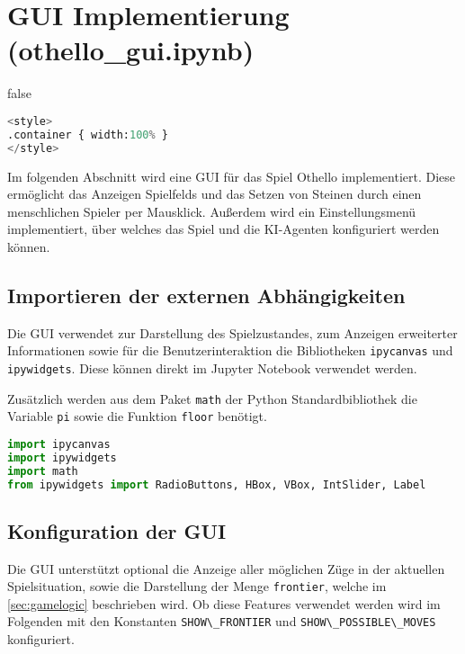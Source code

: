 \hypertarget{gui-implementierung-othello_gui.ipynb}{%
\section{GUI Implementierung
(othello\_gui.ipynb)}\label{gui-implementierung-othello_gui.ipynb}}

\label{sec:gui} \ifx false

\begin{lstlisting}[language=Python]
%%HTML
<style>
.container { width:100% }
</style>
\end{lstlisting}

\fi Im folgenden Abschnitt wird eine \ac{GUI} für das Spiel Othello
implementiert. Diese ermöglicht das Anzeigen Spielfelds und das Setzen
von Steinen durch einen menschlichen Spieler per Mausklick. Außerdem
wird ein Einstellungsmenü implementiert, über welches das Spiel und die
\ac{KI}-Agenten konfiguriert werden können.

\hypertarget{importieren-der-externen-abhuxe4ngigkeiten}{%
\subsection{Importieren der externen
Abhängigkeiten}\label{importieren-der-externen-abhuxe4ngigkeiten}}

Die \ac{GUI} verwendet zur Darstellung des Spielzustandes, zum Anzeigen
erweiterter Informationen sowie für die Benutzerinteraktion die
Bibliotheken \passthrough{\lstinline!ipycanvas!} und
\passthrough{\lstinline!ipywidgets!}. Diese können direkt im Jupyter
Notebook verwendet werden.

Zusätzlich werden aus dem Paket \passthrough{\lstinline!math!} der
Python Standardbibliothek die Variable \passthrough{\lstinline!pi!}
sowie die Funktion \passthrough{\lstinline!floor!} benötigt.

\begin{lstlisting}[language=Python]
import ipycanvas
import ipywidgets
import math
from ipywidgets import RadioButtons, HBox, VBox, IntSlider, Label
\end{lstlisting}

\hypertarget{konfiguration-der-gui}{%
\subsection{Konfiguration der GUI}\label{konfiguration-der-gui}}

Die \ac{GUI} unterstützt optional die Anzeige aller möglichen Züge in
der aktuellen Spielsituation, sowie die Darstellung der Menge
\passthrough{\lstinline!frontier!}, welche im \autoref{sec:gamelogic}
beschrieben wird. Ob diese Features verwendet werden wird im Folgenden
mit den Konstanten \passthrough{\lstinline!SHOW\_FRONTIER!} und
\passthrough{\lstinline!SHOW\_POSSIBLE\_MOVES!} konfiguriert.

